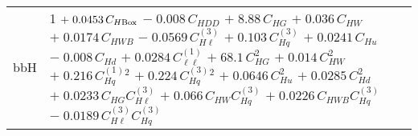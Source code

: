 \begin{tabular}{l|p{}}
    \hline
    bbH & 1 $+\;0.0453\,C_{H\rm{Box}}$ $-\;0.008\,C_{HDD}$ $+\;8.88\,C_{HG}$ $+\;0.036\,C_{HW}$ $+\;0.0174\,C_{HWB}$ $-\;0.0569\,C^{(3)}_{H\ell}$ $+\;0.103\,C^{(3)}_{Hq}$ $+\;0.0241\,C_{Hu}$ $-\;0.008\,C_{Hd}$ $+\;0.0284\,C^{(1)}_{\ell\ell}$ $+\;68.1\,C_{HG}^{2}$ $+\;0.014\,C_{HW}^{2}$ $+\;0.216\,C^{(1)}_{Hq}^{2}$ $+\;0.224\,C^{(3)}_{Hq}^{2}$ $+\;0.0646\,C_{Hu}^{2}$ $+\;0.0285\,C_{Hd}^{2}$ $+\;0.0233\,C_{HG}C^{(3)}_{H\ell}$ $+\;0.066\,C_{HW}C^{(3)}_{Hq}$ $+\;0.0226\,C_{HWB}C^{(3)}_{Hq}$ $-\;0.0189\,C^{(3)}_{H\ell}C^{(3)}_{Hq}$ \\
\end{tabular}